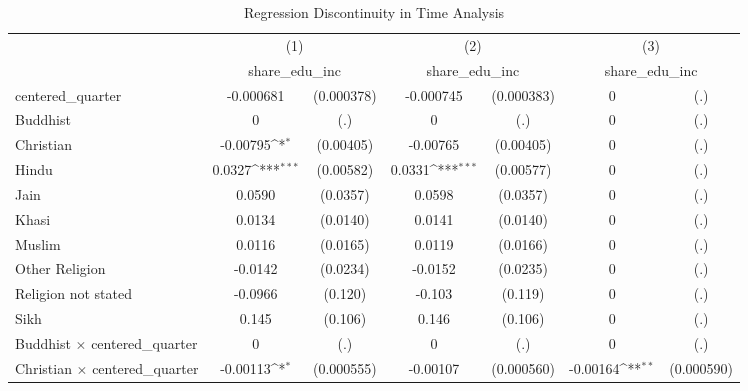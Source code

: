 \begin{table}[htbp]\centering
\def\sym#1{\ifmmode^{#1}\else\(^{#1}\)\fi}
\caption{Regression Discontinuity in Time Analysis}
\begin{tabular}{l*{3}{cc}}
\hline\hline
                    &\multicolumn{2}{c}{(1)}           &\multicolumn{2}{c}{(2)}           &\multicolumn{2}{c}{(3)}           \\
                    &\multicolumn{2}{c}{share\_edu\_inc} &\multicolumn{2}{c}{share\_edu\_inc} &\multicolumn{2}{c}{share\_edu\_inc} \\
\hline
centered\_quarter    &   -0.000681         &  (0.000378)&   -0.000745         &  (0.000383)&           0         &         (.)\\
Buddhist            &           0         &         (.)&           0         &         (.)&           0         &         (.)\\
Christian           &    -0.00795\sym{*}  &   (0.00405)&    -0.00765         &   (0.00405)&           0         &         (.)\\
Hindu               &      0.0327\sym{***}&   (0.00582)&      0.0331\sym{***}&   (0.00577)&           0         &         (.)\\
Jain                &      0.0590         &    (0.0357)&      0.0598         &    (0.0357)&           0         &         (.)\\
Khasi               &      0.0134         &    (0.0140)&      0.0141         &    (0.0140)&           0         &         (.)\\
Muslim              &      0.0116         &    (0.0165)&      0.0119         &    (0.0166)&           0         &         (.)\\
Other Religion      &     -0.0142         &    (0.0234)&     -0.0152         &    (0.0235)&           0         &         (.)\\
Religion not stated &     -0.0966         &     (0.120)&      -0.103         &     (0.119)&           0         &         (.)\\
Sikh                &       0.145         &     (0.106)&       0.146         &     (0.106)&           0         &         (.)\\
Buddhist $\times$ centered\_quarter&           0         &         (.)&           0         &         (.)&           0         &         (.)\\
Christian $\times$ centered\_quarter&    -0.00113\sym{*}  &  (0.000555)&    -0.00107         &  (0.000560)&    -0.00164\sym{**} &  (0.000590)\\

\end{tabular}
\end{table}
